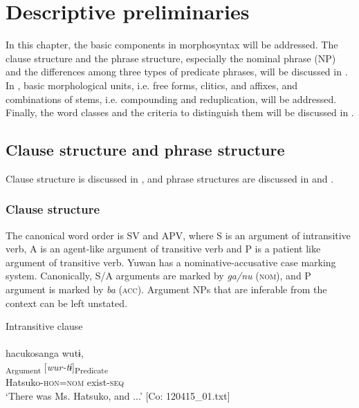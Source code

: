 \chapter{Descriptive preliminaries}\label{chap:4}

In this chapter, the basic components in morphosyntax will be addressed. The clause structure and the phrase structure, especially the nominal phrase (NP) and the differences among three types of predicate phrases, will be discussed in . In , basic morphological units, i.e. free forms, clitics, and affixes, and combinations of stems, i.e. compounding and reduplication, will be addressed. Finally, the word classes and the criteria to distinguish them will be discussed in .

\section{Clause structure and phrase structure}\label{sec:4.1}

Clause structure is discussed in , and phrase structures are discussed in  and .

\subsection{Clause structure}\label{sec:4.1.1}

The canonical word order is SV and APV, where S is an argument of intransitive verb, A is an agent-like argument of transitive verb and P is a patient like argument of transitive verb. Yuwan has a nominative-accusative case marking system. Canonically, S/A arguments are marked by \textit{ga/nu} (\textsc{nom}), and P argument is marked by \textit{ba} (\textsc{acc}). Argument NPs that are inferable from the context can be left unstated.

\ea\label{ex:4.1}
\ea  Intransitive clause\\\label{ex:4.1a}\\
    \glll    hacukosanga  wutɨ,\\
      [\textit{hacuko-san=ga}]\textsubscript{Argument}  [\textit{wur-tɨ}]\textsubscript{Predicate}\\
      Hatsuko-\textsc{hon}=\textsc{nom}  exist-\textsc{seq}\\
      \glt       ‘There was Ms. Hatsuko, and ...’ [Co: 120415\_01.txt]

